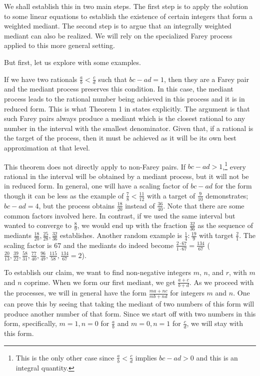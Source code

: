 \documentclass[12pt]{article}
\begin{document}
We shall establish this in two main steps. The first step is to apply the solution to some linear equations to establish the existence of certain integers that form a weighted mediant. The second step is to argue that an integrally weighted mediant can also be realized.  We will rely on the specialized Farey process applied to this more general setting. 

But first, let us explore with some examples. 

If we have two rationals $\frac{a}{b} < \frac{c}{d}$ such that $bc - ad = 1$, then they are a Farey pair and the mediant process preserves this condition. In this case, the mediant process leads to the rational number being achieved in this process and it is in reduced form. This is what Theorem 1 in \cite{richards} states explicitly. The argument is that such Farey pairs always produce a mediant which is the closest rational to any number in the interval with the smallest denominator. Given that, if a rational is the target of the process, then it must be achieved as it will be its own best approximation at that level. 

This theorem does not directly apply to non-Farey pairs. If $bc-ad > 1$,\footnote{This is the only other case since $\frac{a}{b} < \frac{c}{d}$ implies $bc - ad > 0$ and this is an integral quantity.} every rational in the interval will be obtained by a mediant process, but it will not be in reduced form. In general, one will have a scaling factor of $bc-ad$ for the form though it can be less as the example of $\frac{7}{8}< \frac{11}{12}$ with a target of $\frac{9}{10}$ demonstrates; $bc-ad = 4$, but the process obtains $\frac{18}{20}$ instead of $\frac{36}{40}$. Note that there are some common factors involved here. In contrast, if we used the same interval but wanted to converge to $\frac{8}{9}$, we would end up with the fraction $\frac{32}{36}$ as the sequence of mediants $\frac{18}{20}, \frac{25}{28}, \frac{32}{36}$ establishes. Another random example is  $\frac{1}{4} : \frac{19}{9}$ with target $\frac{2}{1}$. The scaling factor is $67$ and the mediants do indeed become $\frac{2 \cdot 67}{1 \cdot 67} = \frac{134}{67}$  ($\frac{20}{13}, \frac{39}{22}, \frac{58}{31}, \frac{77}{40}, \frac{96}{49}, \frac{115}{58}, \frac{134}{67} = 2$). 


To establish our claim, we want to find non-negative integers $m$, $n$, and $r$, with $m$ and $n$ coprime. When we form our first mediant, we get $\frac{a+c}{b+d}$. As we proceed with the processes, we will in general have the form $\frac{ma + nc}{mb + nd}$ for integers $m$ and $n$. One can prove this by seeing that taking the mediant of two numbers of this form will produce another number of that form. Since we start off with two numbers in this form, specifically, $m=1, n=0$ for $\frac{a}{b}$ and $m=0, n=1$ for $\frac{c}{d}$, we will stay with this form. 
\end{document}
